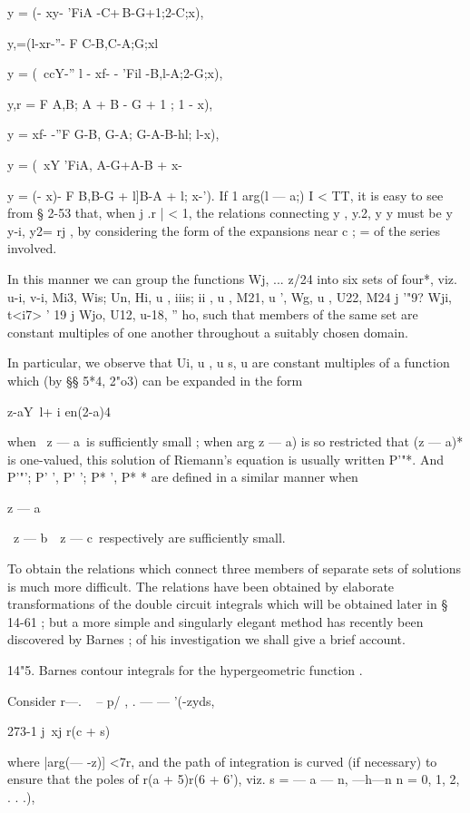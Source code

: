 y = (- xy- 'FiA -C+\,B-G+1;2-C;x),

y,=(l-xr-''- F C-B,C-A;G;xl

y = (\ ccY-'' l - xf- - 'Fil -B,l-A;2-G;x),

y,r = F A,B; A + B - G + 1 ; 1 - x),

y = xf- -''F G-B, G-A; G-A-B-hl; l-x),

y = (\ xY 'FiA, A-G+\;A-B + \; x-%

y = (- x)- F B,B-G + l]B-A + l; x-'). If 1 arg(l — a;) I < TT, it is
easy to see from § 2-53 that, when j .r | < 1, the relations
connecting y , y.2, y y must be y y-i, y2= rj , by considering the
form of the expansions near c ; = of the series involved.

In this manner we can group the functions Wj, ... z/24 into six sets
of four*, viz. u-i, v-i, Mi3, Wis; Un, Hi, u , iiis; ii , u , M21, u
', Wg, u , U22, M24 j '"9? Wji, t<i7> ' 19 j Wjo, U12, u-18, '' ho,
such that members of the same set are constant multiples of one
another throughout a suitably chosen domain.

In particular, we observe that Ui, u , u s, u are constant multiples
of a function which (by §§ 5*4, 2"o3) can be expanded in the form

 z-aY\ l+ i en(2-a)4

when \ z — a\ is sufficiently small ; when arg z — a) is so restricted
that (z — a)* is one-valued, this solution of Riemann's equation is
usually written P'"*. And P'"'; P' ', P' '; P* ', P* * are defined in
a similar manner when

z — a

\ z — b\, \ z — c\ respectively are sufficiently small.

To obtain the relations which connect three members of separate sets
of solutions is much more difficult. The relations have been obtained
by elaborate transformations of the double circuit integrals which
will be obtained later in § 14-61 ; but a more simple and singularly
elegant method has recently been discovered by Barnes ; of his
investigation we shall give a brief account.

14"5. Barnes contour integrals for the hypergeometric function .

Consider r—. ~ -- p/ , . — — '(-zyds,

273-1 j\ xj r(c + s)

where |arg(— -z)] <7r, and the path of integration is curved (if
necessary) to ensure that the poles of r(a + 5)r(6 + 6'), viz. s = — a
— n, —h—n n = 0, 1, 2, . . .),


